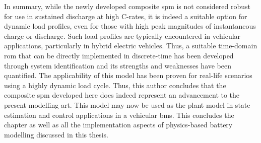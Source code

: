 

In  summary, while  the newly  developed composite  \gls{spm} is  not considered
robust for use in  sustained discharge at high C-rates, it  is indeed a suitable
option for  dynamic load profiles, even  for those with high  peak magnitudes of
instantaneous charge or discharge. Such  load profiles are typically encountered
in vehicular  applications, particularly  in hybrid  electric vehicles.  Thus, a
suitable time-domain \gls{rom} that can be directly implemented in discrete-time
has  been  developed  through  system   identification  and  its  strengths  and
weaknesses have been quantified. The applicability of this model has been proven
for real-life  scenarios using a  highly dynamic  load cycle. Thus,  this author
concludes that the  composite \gls{spm} developed here does  indeed represent an
advancement to  the present  modelling art. This  model may now  be used  as the
plant  model  in  state  estimation  and control  applications  in  a  vehicular
\gls{bms}. This concludes the chapter as  well as all the implementation aspects
of physics-based battery modelling discussed in this thesis.



